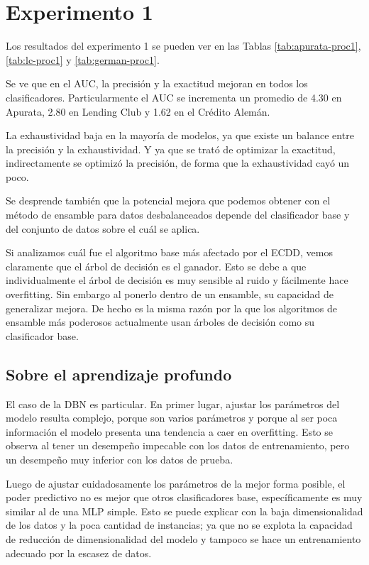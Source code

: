 \section{Experimento 1} %

Los resultados del experimento 1 se pueden ver en las Tablas \ref{tab:apurata-proc1}, \ref{tab:lc-proc1} y \ref{tab:german-proc1}.

Se ve que en el \ac{AUC}, la precisión y la exactitud mejoran en todos los clasificadores. Particularmente el AUC se incrementa un promedio de 4.30 en Apurata, 2.80 en Lending Club y 1.62 en el Crédito Alemán.

La exhaustividad baja en la mayoría de modelos, ya que existe un balance entre la precisión y la exhaustividad. Y ya que se trató de optimizar la exactitud, indirectamente se optimizó la precisión, de forma que la exhaustividad cayó un poco.

Se desprende también que la potencial mejora que podemos obtener con el método de ensamble para datos desbalanceados depende del clasificador base y del conjunto de datos sobre el cuál se aplica.

Si analizamos cuál fue el algoritmo base más afectado por el \ac{ECDD}, vemos claramente que el árbol de decisión es el ganador. Esto se debe a que individualmente el árbol de decisión es muy sensible al ruido y fácilmente hace overfitting. Sin embargo al ponerlo dentro de un ensamble, su capacidad de generalizar mejora. De hecho es la misma razón por la que los algoritmos de ensamble más poderosos actualmente usan árboles de decisión como su clasificador base.

\subsection{Sobre el aprendizaje profundo}

El caso de la \ac{DBN} es particular. En primer lugar, ajustar los parámetros del modelo resulta complejo, porque son varios parámetros y porque al ser poca información el modelo presenta una tendencia a caer en overfitting. Esto se observa al tener un desempeño impecable con los datos de entrenamiento, pero un desempeño muy inferior con los datos de prueba.

Luego de ajustar cuidadosamente los parámetros de la mejor forma posible, el poder predictivo no es mejor que otros clasificadores base, específicamente es muy similar al de una \ac{MLP} simple. Esto se puede explicar con la baja dimensionalidad de los datos y la poca cantidad de instancias; ya que no se explota la capacidad de reducción de dimensionalidad del modelo y tampoco se hace un entrenamiento adecuado por la escasez de datos.

